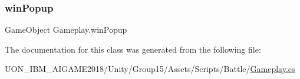 \mbox{\label{class_gameplay_ab3a83b9c136b94d0633708b8366b71c4}} 
\subsubsection{\texorpdfstring{winPopup}{winPopup}}
{\footnotesize\ttfamily Game\+Object Gameplay.\+win\+Popup}



The documentation for this class was generated from the following file\+:\begin{DoxyCompactItemize}
\item 
U\+O\+N\+\_\+\+I\+B\+M\+\_\+\+A\+I\+G\+A\+M\+E2018/\+Unity/\+Group15/\+Assets/\+Scripts/\+Battle/\mbox{\hyperlink{_gameplay_8cs}{Gameplay.\+cs}}\end{DoxyCompactItemize}
